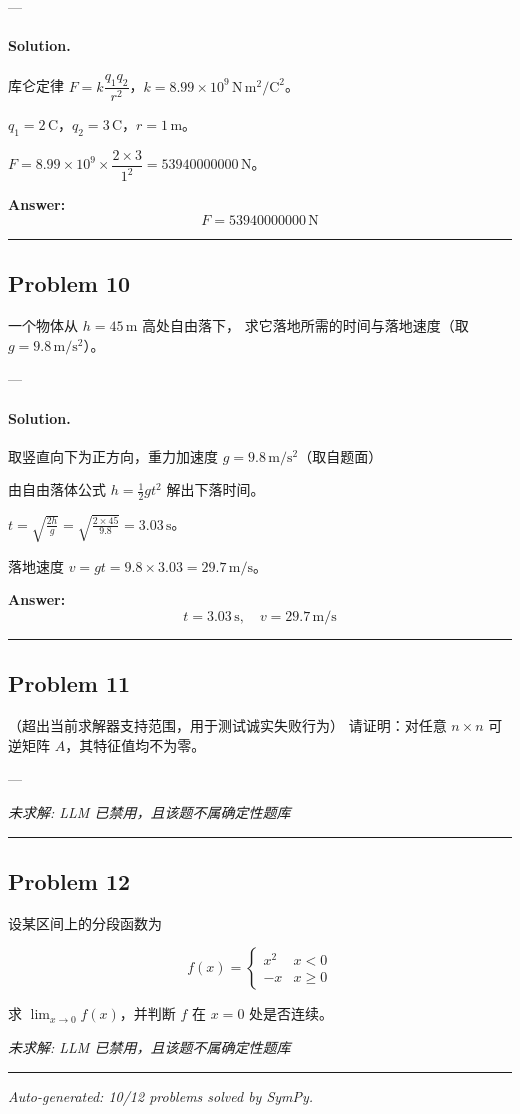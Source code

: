 \documentclass[12pt, a4paper]{article}
\newcommand{\problem}[1]{\subsection*{Problem #1}}
\newcommand{\solution}{\paragraph{Solution.}}
\begin{document}
---

\solution

库仑定律 $F = k\dfrac{q_1q_2}{r^2}$，$k = 8.99\times10^9\,\mathrm{N\,m^2/C^2}$。

$q_1 = 2\,\mathrm{C}$，$q_2 = 3\,\mathrm{C}$，$r = 1\,\mathrm{m}$。

$F = 8.99\times10^9 \times \dfrac{2\times3}{1^2} = 53940000000\,\mathrm{N}$。

\textbf{Answer:}
\[\boxed{F = 53940000000\,\mathrm{N}}\]

\vspace{1em}
\hrule
\vspace{1em}

\problem{10}

一个物体从 $h = 45\,\mathrm{m}$ 高处自由落下，
求它落地所需的时间与落地速度（取 $g = 9.8\,\mathrm{m/s^2}$）。

---

\solution

取竖直向下为正方向，重力加速度 $g = 9.8\,\mathrm{m/s^2}$（取自题面）

由自由落体公式 $h = \tfrac12 g t^2$ 解出下落时间。

$t = \sqrt{\frac{2h}{g}} = \sqrt{\frac{2 \times 45}{9.8}} = 3.03\,\mathrm{s}$。

落地速度 $v = gt = 9.8 \times 3.03 = 29.7\,\mathrm{m/s}$。

\textbf{Answer:}
\[\boxed{t = 3.03\,\mathrm{s},\quad v = 29.7\,\mathrm{m/s}}\]

\vspace{1em}
\hrule
\vspace{1em}

\problem{11}

（超出当前求解器支持范围，用于测试诚实失败行为）
请证明：对任意 $n \times n$ 可逆矩阵 $A$，其特征值均不为零。

---

\textit{\color{red} 未求解: LLM 已禁用，且该题不属确定性题库}

\vspace{1em}
\hrule
\vspace{1em}

\problem{12}

设某区间上的分段函数为

$$f(x) = \begin{cases} x^2 & x < 0 \\ -x & x \ge 0 \end{cases}$$

求 $\lim_{x \to 0} f(x)$，并判断 $f$ 在 $x = 0$ 处是否连续。

\textit{\color{red} 未求解: LLM 已禁用，且该题不属确定性题库}

\vspace{1em}
\hrule
\vspace{1em}


\vspace{2em}
\noindent\textit{Auto-generated: 10/12 problems solved by SymPy.}
\end{document}

